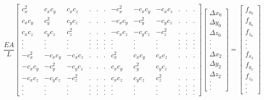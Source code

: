 \begin{equation}
\frac {EA} L
\begin{bmatrix}
	c^2_x & c_xc_y & c_xc_z & . & . & . & -c^2_x & -c_xc_y & -c_xc_z & . & . & . \\
	c_xc_y & c^2_y & c_yc_z & . & . & . & -c_xc_y & -c^2_y & -c_yc_z & . & . & . \\
	c_xc_z & c_yc_z & c^2_z & . & . & . & -c_xc_z & -c_yc_z & -c^2_z & . & . & . \\
	. & . & . & . & . & . & . & . & . & . & . & . \\
	. & . & . & . & . & . & . & . & . & . & . & . \\
	. & . & . & . & . & . & . & . & . & . & . & . \\
	-c^2_x & -c_xc_y & -c_xc_z & . & . & . & c^2_x & c_xc_y & c_xc_z & . & . & . \\
	-c_xc_y & -c^2_y & -c_yc_z & . & . & . & c_xc_y & c^2_y & c_yc_z & . & . & . \\
	-c_xc_z & -c_yc_z & -c^2_z & . & . & . & c_xc_z & c_yc_z & c^2_z & . & . & . \\
	. & . & . & . & . & . & . & . & . & . & . & . \\
	. & . & . & . & . & . & . & . & . & . & . & . \\
	. & . & . & . & . & . & . & . & . & . & . & .
\end{bmatrix}
\begin{bmatrix}
	\Delta x_0 \\
	\Delta y_0 \\
	\Delta z_0 \\
	. \\
	. \\
	. \\
	\Delta x_2 \\
	\Delta y_2 \\
	\Delta z_2 \\
	. \\
	. \\
	.
\end{bmatrix}
=
\begin{bmatrix}
	f_{x_0} \\
	f_{y_0} \\
	f_{z_0} \\
	. \\
	. \\
	. \\
	f_{x_2} \\
	f_{y_2} \\
	f_{z_2} \\
	. \\
	. \\
	.
\end{bmatrix}
\label{eq:detail:K:element}
\end{equation}

